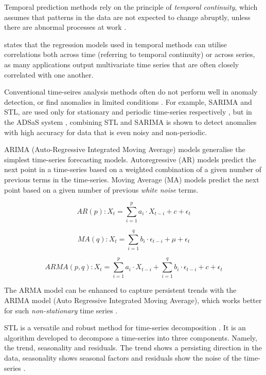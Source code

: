 \documentclass{mproj}
\begin{document}
Temporal prediction methods rely on the principle of \textit{temporal continuity}, which assumes that patterns in the data are not expected to change abruptly, unless there are abnormal processes at work \citep{outlierAnalysisBook}.

\cite{outlierAnalysisBook} states that the regression models used in temporal methods can utilise correlations both across time (referring to temporal continuity) or across series, as many applications output multivariate time series that are often closely correlated with one another.

Conventional time-seires analysis methods often do not perform well in anomaly detection, or find anomalies in limited conditions \citep{ADSaS}. For example, SARIMA and STL, are used only for stationary and periodic time-series respectively \citep{ADSaS}, but in the ADSaS system \citep{ADSaS}, combining STL and SARIMA is shown to detect anomalies with high accuracy for data that is even noisy and non-periodic.

ARIMA (Auto-Regressive Integrated Moving Average) models generalise the simplest time-series forecasting models. Autoregressive (AR) models predict the next point in a time-series based on a weighted combination of a given number of previous terms in the time-series. Moving Average (MA) models predict the next point based on a given number of previous \textit{white noise} terms.

$$ AR(p): X_t = \sum_{i=1}^{p} a_i \cdot X_{t-i} + c + \epsilon_t $$ 
\citep{outlierAnalysisBook}

$$ MA(q): X_t = \sum_{i=1}^{q} b_i \cdot \epsilon_{t-i} + \mu + \epsilon_t $$ 
\citep{outlierAnalysisBook}

$$ ARMA(p, q): X_t = \sum_{i=1}^{p} a_i \cdot X_{t-i} + \sum_{i=1}^{q} b_i \cdot \epsilon_{t-i} + c + \epsilon_t $$ 
\citep{outlierAnalysisBook}

The ARMA model can be enhanced to capture persistent trends with the ARIMA model (Auto Regressive Integrated Moving Average), which works better for such \textit{non-stationary} time series \citep{outlierAnalysisBook}.

STL is a versatile and robust method for time-series decomposition \citep{ADSaS}. It is an algorithm developed to decompose a time-series into three components. Namely, the trend, seasonality and residuals. The trend shows a persisting direction in the data, seasonality shows seasonal factors and residuals show the noise of the time-series \citep{ADSaS}.
\end{document}
